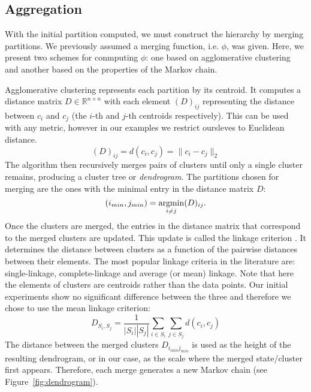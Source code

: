\subsection{Aggregation}
\label{sec:state-aggregation-impl}

With the initial partition computed, we must construct the hierarchy by merging partitions. We previously assumed a merging function, i.e. $\phi$, was given. Here, we present two schemes for conmputing $\phi$: one based on agglomerative clustering~\cite{Murtagh83} and another based on the properties of the Markov chain. 

Agglomerative clustering represents each partition by its centroid. It computes a distance matrix $D \in \mathbb{R}^{n \times n}$ with each element $(D)_{ij}$ representing the distance between $c_i$ and $c_j$ (the $i$-th and $j$-th centroids respectively). This can be used with any metric, however in our examples we restrict oursleves to Euclidean distance.
\begin{equation}
	\nonumber
	(D)_{ij} = d(c_i, c_j) = \|c_i - c_j\|_2
\end{equation}
The algorithm then recursively merges pairs of clusters until only a single cluster remains, producing a cluster tree or \emph{dendrogram}. The partitions chosen for merging are the ones with the minimal entry in the distance matrix $D$:
\begin{equation}
	\nonumber
	(i_{min},j_{min}) = \argmin\limits_{i \neq j}(D)_{ij}.
\end{equation}
Once the clusters are merged, the entries in the distance matrix that correspond to the merged clusters are updated. This update is called the linkage criterion \cite{Hartigan:1975:CA:540298}. It determines the distance between clusters as a function of the pairwise distances between their elements. The most popular linkage criteria in the literature are: single-linkage, complete-linkage and average (or mean) linkage. Note that here the elements of clusters are centroids rather than the data points. 
Our initial experiments show no significant difference between the three and therefore we chose to use the mean linkage criterion:
\begin{equation}
	\nonumber
	D_{S_i,S_j} = \frac{1}{\left|S_i\right|\left|S_j\right|}\sum\limits_{i \in S_i}\sum\limits_{j \in S_j} d(c_i,c_j)
\end{equation}
The distance between the merged clusters $D_{i_{min} j_{min}}$ is used as the height of the resulting dendrogram, or in our case, as the scale where the merged state/cluster first appears. Therefore, each merge generates a new Markov chain (see Figure~\ref{fig:dendrogram}).%
